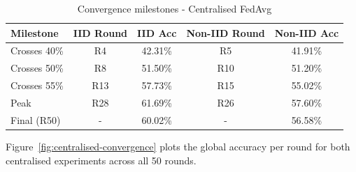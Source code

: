 \documentclass[12pt]{report}
\begin{document}
\begin{table}[H]
\centering
\begin{tabular}{lcccc}
\toprule
\textbf{Milestone} & \textbf{IID Round} & \textbf{IID Acc} &
\textbf{Non-IID Round} & \textbf{Non-IID Acc} \\
\midrule
Crosses 40\% & R4  & 42.31\% & R5  & 41.91\% \\
Crosses 50\% & R8  & 51.50\% & R10 & 51.20\% \\
Crosses 55\% & R13 & 57.73\% & R15 & 55.02\% \\
Peak         & R28 & 61.69\% & R26 & 57.60\% \\
Final (R50)  & - & 60.02\% & - & 56.58\% \\
\bottomrule
\end{tabular}
\vspace{0.5cm}
\caption{Convergence milestones - Centralised FedAvg}
\label{tab:centralised-milestones}
\end{table}

Figure~\ref{fig:centralised-convergence} plots the global accuracy
per round for both centralised experiments across all 50 rounds.
 
\end{document}
